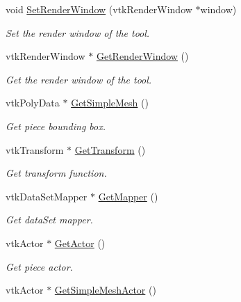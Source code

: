 \begin{DoxyCompactItemize}
void \hyperlink{classvtkPiece_ad34b59d8e6996866b71bb4abb6c46fdb}{SetRenderWindow} (vtkRenderWindow $\ast$window)
\begin{DoxyCompactList}\small\item\em Set the render window of the tool. \item\end{DoxyCompactList}\item 
vtkRenderWindow $\ast$ \hyperlink{classvtkPiece_a996426a2608412e8180fe12bff9ae5d7}{GetRenderWindow} ()
\begin{DoxyCompactList}\small\item\em Get the render window of the tool. \item\end{DoxyCompactList}\item 
vtkPolyData $\ast$ \hyperlink{classvtkPiece_a44bb3b9c2be3bac663b22c31f98daa09}{GetSimpleMesh} ()
\begin{DoxyCompactList}\small\item\em Get piece bounding box. \item\end{DoxyCompactList}\item 
vtkTransform $\ast$ \hyperlink{classvtkPiece_a5f0889b30ed3245f0e0797a94709c583}{GetTransform} ()
\begin{DoxyCompactList}\small\item\em Get transform function. \item\end{DoxyCompactList}\item 
vtkDataSetMapper $\ast$ \hyperlink{classvtkPiece_aca0100088140d579b1391f7ad5a557ec}{GetMapper} ()
\begin{DoxyCompactList}\small\item\em Get dataSet mapper. \item\end{DoxyCompactList}\item 
vtkActor $\ast$ \hyperlink{classvtkPiece_a6ee22f47f41cc14bdf48f692bc16f1f5}{GetActor} ()
\begin{DoxyCompactList}\small\item\em Get piece actor. \item\end{DoxyCompactList}\item 
\hypertarget{classvtkPiece_ae463c0ca4227140a88efcb52071e642d}{
vtkActor $\ast$ \hyperlink{classvtkPiece_ae463c0ca4227140a88efcb52071e642d}{GetSimpleMeshActor} ()}
\label{classvtkPiece_ae463c0ca4227140a88efcb52071e642d}


\end{DoxyCompactItemize}
